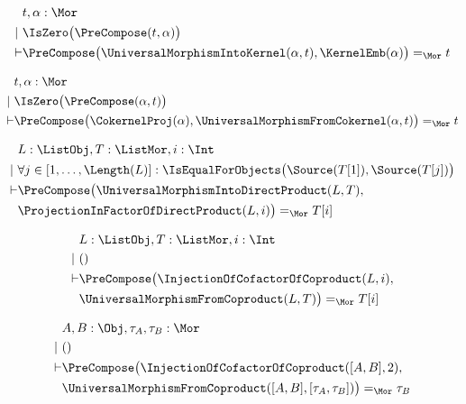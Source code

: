 \begin{sequent}
\begin{align*}
  &t, \alpha:\Mor\\
  |~ &\IsZero\big( \PreCompose( t, \alpha ) \big)\\
  \vdash &\PreCompose\big(\UniversalMorphismIntoKernel( \alpha , t ), \KernelEmb( \alpha ) \big) =_{\Mor} t
\end{align*}
\end{sequent}

\begin{sequent}
\begin{align*}
  &t, \alpha:\Mor\\
  |~  &\IsZero\big(\PreCompose(\alpha, t)\big)\\
  \vdash &\PreCompose\big(\CokernelProj( \alpha ), \UniversalMorphismFromCokernel( \alpha, t )\big) =_{\Mor} t
\end{align*}
\end{sequent}

\begin{sequent}
\begin{align*}
  &L:\ListObj, T:\ListMor, i:\Int\\
  | ~& \forall j \in [ 1, \dots, \Length( L ) ]: \IsEqualForObjects\big(\Source( T[1] ), \Source( T[j] ) \big) \\
  \vdash &\PreCompose\big(\UniversalMorphismIntoDirectProduct( L, T ), \\
  &\ProjectionInFactorOfDirectProduct( L, i ) \big) =_{\Mor} T[i]
\end{align*}
\end{sequent}

\begin{sequent}
\begin{align*}
  &L:\ListObj, T:\ListMor, i:\Int\\
  |~ &()\\
  \vdash &\PreCompose\big(\InjectionOfCofactorOfCoproduct( L, i ),\\
  &\UniversalMorphismFromCoproduct( L, T ) \big) =_{\Mor} T[i]
\end{align*}
\end{sequent}

\begin{sequent}
\begin{align*}
  &A, B:\Obj, \tau_A, \tau_B:\Mor \\
  |~ &()\\
  \vdash &\PreCompose\big(\InjectionOfCofactorOfCoproduct( [A, B], 2 ),\\
  &\UniversalMorphismFromCoproduct( [A,B], [\tau_A, \tau_B] ) \big) =_{\Mor} \tau_B 
\end{align*}
\end{sequent}


